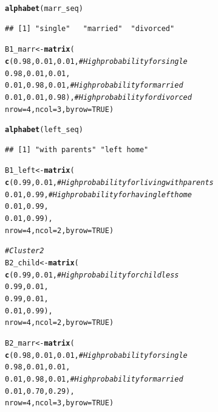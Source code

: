\documentclass[12pt]{article}\usepackage[]{graphicx}\usepackage[]{color}
\makeatletter
\newcommand{\hlnum}[1]{\textcolor[rgb]{0.686,0.059,0.569}{#1}}%
\newcommand{\hlcom}[1]{\textcolor[rgb]{0.678,0.584,0.686}{\textit{#1}}}%
\newcommand{\hlstd}[1]{\textcolor[rgb]{0.345,0.345,0.345}{#1}}%
\newcommand{\hlkwb}[1]{\textcolor[rgb]{0.69,0.353,0.396}{#1}}%
\newcommand{\hlkwc}[1]{\textcolor[rgb]{0.333,0.667,0.333}{#1}}%
\newcommand{\hlkwd}[1]{\textcolor[rgb]{0.737,0.353,0.396}{\textbf{#1}}}%
\newenvironment{kframe}{%
 \def\at@end@of@kframe{}%
 \ifinner\ifhmode%
  \def\at@end@of@kframe{\end{minipage}}%
  \begin{minipage}{\columnwidth}%
 \fi\fi%
 \def\FrameCommand##1{\hskip\@totalleftmargin \hskip-\fboxsep
 \colorbox{shadecolor}{##1}\hskip-\fboxsep
     \hskip-\linewidth \hskip-\@totalleftmargin \hskip\columnwidth}%
 \MakeFramed {\advance\hsize-\width
   \@totalleftmargin\z@ \linewidth\hsize
   \@setminipage}}%
 {\par\unskip\endMakeFramed%
 \at@end@of@kframe}
\newenvironment{knitrout}{}{} %
\makeatother
\begin{document}
\begin{knitrout}
\begin{kframe}
\begin{alltt}
\hlkwd{alphabet}\hlstd{(marr_seq)}
\end{alltt}
\begin{verbatim}
## [1] "single"   "married"  "divorced"
\end{verbatim}
\begin{alltt}
\hlstd{B1_marr} \hlkwb{<-} \hlkwd{matrix}\hlstd{(}
  \hlkwd{c}\hlstd{(}\hlnum{0.98}\hlstd{,} \hlnum{0.01}\hlstd{,} \hlnum{0.01}\hlstd{,} \hlcom{# High probability for single}
    \hlnum{0.98}\hlstd{,} \hlnum{0.01}\hlstd{,} \hlnum{0.01}\hlstd{,}
    \hlnum{0.01}\hlstd{,} \hlnum{0.98}\hlstd{,} \hlnum{0.01}\hlstd{,} \hlcom{# High probability for married}
    \hlnum{0.01}\hlstd{,} \hlnum{0.01}\hlstd{,} \hlnum{0.98}\hlstd{),} \hlcom{# High probability for divorced}
  \hlkwc{nrow} \hlstd{=} \hlnum{4}\hlstd{,} \hlkwc{ncol} \hlstd{=} \hlnum{3}\hlstd{,} \hlkwc{byrow} \hlstd{=} \hlnum{TRUE}\hlstd{)}

\hlkwd{alphabet}\hlstd{(left_seq)}
\end{alltt}
\begin{verbatim}
## [1] "with parents" "left home"
\end{verbatim}
\begin{alltt}
\hlstd{B1_left} \hlkwb{<-} \hlkwd{matrix}\hlstd{(}
  \hlkwd{c}\hlstd{(}\hlnum{0.99}\hlstd{,} \hlnum{0.01}\hlstd{,} \hlcom{# High probability for living with parents}
    \hlnum{0.01}\hlstd{,} \hlnum{0.99}\hlstd{,} \hlcom{# High probability for having left home}
    \hlnum{0.01}\hlstd{,} \hlnum{0.99}\hlstd{,}
    \hlnum{0.01}\hlstd{,} \hlnum{0.99}\hlstd{),}
  \hlkwc{nrow} \hlstd{=} \hlnum{4}\hlstd{,} \hlkwc{ncol} \hlstd{=} \hlnum{2}\hlstd{,} \hlkwc{byrow} \hlstd{=} \hlnum{TRUE}\hlstd{)}

\hlcom{# Cluster 2}
\hlstd{B2_child} \hlkwb{<-} \hlkwd{matrix}\hlstd{(}
  \hlkwd{c}\hlstd{(}\hlnum{0.99}\hlstd{,} \hlnum{0.01}\hlstd{,} \hlcom{# High probability for childless}
    \hlnum{0.99}\hlstd{,} \hlnum{0.01}\hlstd{,}
    \hlnum{0.99}\hlstd{,} \hlnum{0.01}\hlstd{,}
    \hlnum{0.01}\hlstd{,} \hlnum{0.99}\hlstd{),}
  \hlkwc{nrow} \hlstd{=} \hlnum{4}\hlstd{,} \hlkwc{ncol} \hlstd{=} \hlnum{2}\hlstd{,} \hlkwc{byrow} \hlstd{=} \hlnum{TRUE}\hlstd{)}

\hlstd{B2_marr} \hlkwb{<-} \hlkwd{matrix}\hlstd{(}
  \hlkwd{c}\hlstd{(}\hlnum{0.98}\hlstd{,} \hlnum{0.01}\hlstd{,} \hlnum{0.01}\hlstd{,} \hlcom{# High probability for single}
    \hlnum{0.98}\hlstd{,} \hlnum{0.01}\hlstd{,} \hlnum{0.01}\hlstd{,}
    \hlnum{0.01}\hlstd{,} \hlnum{0.98}\hlstd{,} \hlnum{0.01}\hlstd{,} \hlcom{# High probability for married}
    \hlnum{0.01}\hlstd{,} \hlnum{0.70}\hlstd{,} \hlnum{0.29}\hlstd{),}
  \hlkwc{nrow} \hlstd{=} \hlnum{4}\hlstd{,} \hlkwc{ncol} \hlstd{=} \hlnum{3}\hlstd{,} \hlkwc{byrow} \hlstd{=} \hlnum{TRUE}\hlstd{)}


\end{alltt}
\end{kframe}
\end{knitrout}
\end{document}

